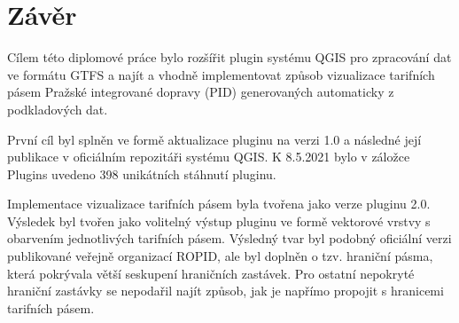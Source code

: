 \chapter*{Závěr}
\label{6-zaver}

Cílem této diplomové práce bylo rozšířit plugin systému QGIS pro zpracování dat 
ve formátu GTFS a najít a vhodně implementovat způsob vizualizace tarifních pásem Pražské integrované dopravy 
(PID) generovaných automaticky z podkladových dat.

První cíl byl splněn ve formě aktualizace pluginu na verzi 1.0 a následné její publikace v oficiálním
repozitáři systému QGIS. K 8.5.2021 bylo v záložce Plugins uvedeno 398 unikátních stáhnutí pluginu.

Implementace vizualizace tarifních pásem byla tvořena jako verze pluginu 2.0. Výsledek
byl tvořen jako volitelný výstup pluginu ve formě vektorové vrstvy s obarvením jednotlivých tarifních pásem.
Výsledný tvar byl podobný oficiální verzi publikované veřejně organizací ROPID, ale byl doplněn o tzv. hraniční pásma,
která pokrývala větší seskupení hraničních zastávek. Pro ostatní nepokryté hraniční zastávky 
se nepodařil najít způsob, jak je napřímo propojit s hranicemi tarifních pásem. 

